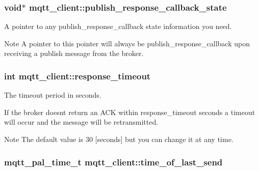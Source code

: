 \subsubsection[{\texorpdfstring{publish\+\_\+response\+\_\+callback\+\_\+state}{publish_response_callback_state}}]{\setlength{\rightskip}{0pt plus 5cm}void$\ast$ mqtt\+\_\+client\+::publish\+\_\+response\+\_\+callback\+\_\+state}\hypertarget{structmqtt__client_a948d816462128ef2216c230644407f21}{}\label{structmqtt__client_a948d816462128ef2216c230644407f21}


A pointer to any publish\+\_\+response\+\_\+callback state information you need. 

\begin{DoxyNote}{Note}
A pointer to this pointer will always be publish\+\_\+response\+\_\+callback upon receiving a publish message from the broker. 
\end{DoxyNote}
\subsubsection[{\texorpdfstring{response\+\_\+timeout}{response_timeout}}]{\setlength{\rightskip}{0pt plus 5cm}int mqtt\+\_\+client\+::response\+\_\+timeout}\hypertarget{structmqtt__client_a4ee652148f2b1b338f1527a85879e970}{}\label{structmqtt__client_a4ee652148f2b1b338f1527a85879e970}


The timeout period in seconds. 

If the broker doesn\textquotesingle{}t return an A\+CK within response\+\_\+timeout seconds a timeout will occur and the message will be retransmitted.

\begin{DoxyNote}{Note}
The default value is 30 \mbox{[}seconds\mbox{]} but you can change it at any time. 
\end{DoxyNote}
\subsubsection[{\texorpdfstring{time\+\_\+of\+\_\+last\+\_\+send}{time_of_last_send}}]{\setlength{\rightskip}{0pt plus 5cm}mqtt\+\_\+pal\+\_\+time\+\_\+t mqtt\+\_\+client\+::time\+\_\+of\+\_\+last\+\_\+send}\hypertarget{structmqtt__client_a9e1ad5b2573d6e693a21031a89b1717e}{}\label{structmqtt__client_a9e1ad5b2573d6e693a21031a89b1717e}


